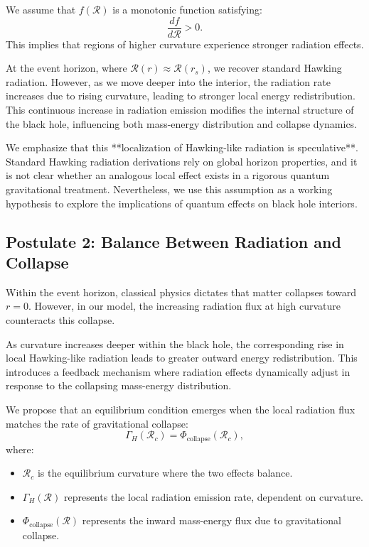 We assume that \( f(\mathcal{R}) \) is a monotonic function satisfying:
\begin{equation}
    \frac{df}{d\mathcal{R}} > 0.
\end{equation}
This implies that regions of higher curvature experience stronger radiation effects.

At the event horizon, where \( \mathcal{R}(r) \approx \mathcal{R}(r_s) \), we recover standard Hawking radiation. However, as we move deeper into the interior, the radiation rate increases due to rising curvature, leading to stronger local energy redistribution. This continuous increase in radiation emission modifies the internal structure of the black hole, influencing both mass-energy distribution and collapse dynamics.

We emphasize that this **localization of Hawking-like radiation is speculative**. Standard Hawking radiation derivations rely on global horizon properties, and it is not clear whether an analogous local effect exists in a rigorous quantum gravitational treatment. Nevertheless, we use this assumption as a working hypothesis to explore the implications of quantum effects on black hole interiors.
\subsection{Postulate 2: Balance Between Radiation and Collapse}
Within the event horizon, classical physics dictates that matter collapses toward \( r=0 \). However, in our model, the increasing radiation flux at high curvature counteracts this collapse.

As curvature increases deeper within the black hole, the corresponding rise in local Hawking-like radiation leads to greater outward energy redistribution. This introduces a feedback mechanism where radiation effects dynamically adjust in response to the collapsing mass-energy distribution.

We propose that an equilibrium condition emerges when the local radiation flux matches the rate of gravitational collapse:
\begin{equation}
    \Gamma_H(\mathcal{R}_c) = \Phi_{\text{collapse}}(\mathcal{R}_c),
\end{equation}
where:
\begin{itemize}
    \item \( \mathcal{R}_c \) is the equilibrium curvature where the two effects balance.
    \item \( \Gamma_H(\mathcal{R}) \) represents the local radiation emission rate, dependent on curvature.
    \item \( \Phi_{\text{collapse}}(\mathcal{R}) \) represents the inward mass-energy flux due to gravitational collapse.
\end{itemize}

